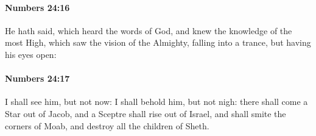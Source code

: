 		\paragraph{Numbers 24:16} %
			\label{NUMBERS-24-16}

			He hath said, which heard the words of God, and knew the knowledge of the most High, which saw the vision of the Almighty, falling into a trance, but having his eyes open:


		\paragraph{Numbers 24:17} %
			\label{NUMBERS-24-17}

			I shall see him, but not now: I shall behold him, but not nigh: there shall come a Star out of Jacob, and a Sceptre shall rise out of Israel, and shall smite the corners of Moab, and destroy all the children of Sheth.

